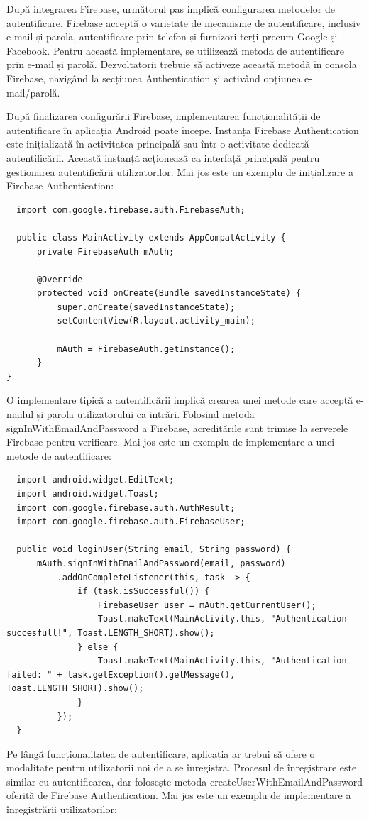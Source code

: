 \documentclass[runningheads]{llncs}
\begin{document}
După integrarea Firebase, următorul pas implică configurarea metodelor de autentificare. Firebase acceptă o varietate de mecanisme de autentificare, inclusiv e-mail și parolă, autentificare prin telefon și furnizori terți precum Google și Facebook. Pentru această implementare, se utilizează metoda de autentificare prin e-mail și parolă. Dezvoltatorii trebuie să activeze această metodă în consola Firebase, navigând la secțiunea Authentication și activând opțiunea e-mail/parolă.

După finalizarea configurării Firebase, implementarea funcționalității de autentificare în aplicația Android poate începe. Instanța Firebase Authentication este inițializată în activitatea principală sau într-o activitate dedicată autentificării. Această instanță acționează ca interfață principală pentru gestionarea autentificării utilizatorilor. Mai jos este un exemplu de inițializare a Firebase Authentication:

\begin{lstlisting}
  import com.google.firebase.auth.FirebaseAuth;

  public class MainActivity extends AppCompatActivity {
      private FirebaseAuth mAuth;

      @Override
      protected void onCreate(Bundle savedInstanceState) {
          super.onCreate(savedInstanceState);
          setContentView(R.layout.activity_main);

          mAuth = FirebaseAuth.getInstance();
      }
}
\end{lstlisting}

O implementare tipică a autentificării implică crearea unei metode care acceptă e-mailul și parola utilizatorului ca intrări. Folosind metoda signInWithEmailAndPassword a Firebase, acreditările sunt trimise la serverele Firebase pentru verificare. Mai jos este un exemplu de implementare a unei metode de autentificare:

\begin{lstlisting}
  import android.widget.EditText;
  import android.widget.Toast;
  import com.google.firebase.auth.AuthResult;
  import com.google.firebase.auth.FirebaseUser;

  public void loginUser(String email, String password) {
      mAuth.signInWithEmailAndPassword(email, password)
          .addOnCompleteListener(this, task -> {
              if (task.isSuccessful()) {
                  FirebaseUser user = mAuth.getCurrentUser();
                  Toast.makeText(MainActivity.this, "Authentication succesfull!", Toast.LENGTH_SHORT).show();
              } else {
                  Toast.makeText(MainActivity.this, "Authentication failed: " + task.getException().getMessage(), Toast.LENGTH_SHORT).show();
              }
          });
  }
\end{lstlisting}
Pe lângă funcționalitatea de autentificare, aplicația ar trebui să ofere o modalitate pentru utilizatorii noi de a se înregistra. Procesul de înregistrare este similar cu autentificarea, dar folosește metoda createUserWithEmailAndPassword oferită de Firebase Authentication. Mai jos este un exemplu de implementare a înregistrării utilizatorilor:
\end{document}
